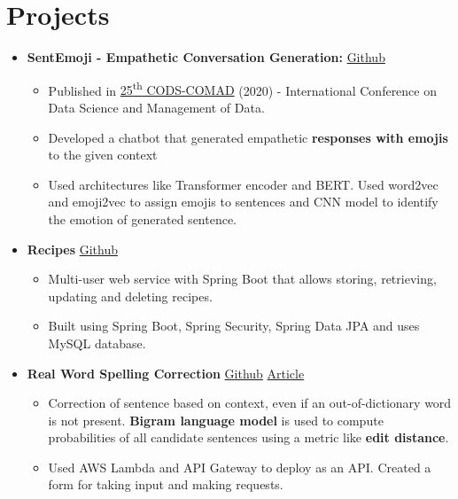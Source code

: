 \documentclass[letterpaper,11pt]{article}
\newcommand{\resumeItem}[1]{
    \item\small{
        {#1 \vspace{-2pt}}
    }
}
\newcommand{\resumeSubHeadingListStart}{\begin{itemize}[leftmargin=*]}
\newcommand{\resumeSubHeadingListEnd}{\end{itemize}}
\newcommand{\resumeItemListStart}{\begin{itemize}}
\newcommand{\resumeItemListEnd}{\end{itemize}\vspace{-5pt}}
\newcommand{\resumeProject}[1]{
  \vspace{-1pt}\item{#1}
    \vspace{-5pt}
}
\begin{document}
\section{Projects}
    \resumeSubHeadingListStart
        \resumeProject{\textbf{SentEmoji - Empathetic Conversation Generation:} \href{https://github.com/JatinDholakia/SentEmojiBot}{\color{blue}Github     }}
            \resumeItemListStart
                \resumeItem
                {Published in \href{https://dl.acm.org/doi/abs/10.1145/3371158.3371218}{\color{blue}25\textsuperscript{th} CODS-COMAD} (2020) - International Conference on Data Science and Management of Data.}
                \resumeItem
                {Developed a chatbot that generated empathetic \textbf{responses with emojis} to the given context}
                \resumeItem
                {Used architectures like Transformer encoder and BERT. Used word2vec and emoji2vec to assign emojis to sentences and CNN model to identify the emotion of generated sentence.}
            \resumeItemListEnd
        \resumeProject{\textbf{Recipes} \href{https://github.com/JatinDholakia/Recipes} {\color{blue}Github}}
            \resumeItemListStart
                \resumeItem
                {Multi-user web service with Spring Boot that allows storing, retrieving, updating and deleting recipes.}
                \resumeItem
                {Built using Spring Boot, Spring Security, Spring Data JPA and uses MySQL database.}
            \resumeItemListEnd
        \resumeProject{\textbf{Real Word Spelling Correction} \href{https://github.com/JatinDholakia/Spelling-Correction}{\color{blue}Github} \href{https://medium.com/analytics-vidhya/real-word-spell-correction-c64a3a02c64d}{\color{blue}Article}}
            \resumeItemListStart
                \resumeItem
                {Correction of sentence based on context, even if an out-of-dictionary word is not present. \textbf{Bigram language model} is used to compute probabilities of all candidate sentences using a metric like \textbf{edit distance}.}
                \resumeItem
                {Used AWS Lambda and API Gateway to deploy as an API. Created a form for taking input and making requests.}
            \resumeItemListEnd
    \resumeSubHeadingListEnd
\end{document}
